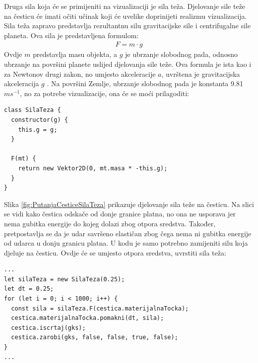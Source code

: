 \documentclass{foi}
\begin{document}
Druga sila koja će se primijeniti na vizualizaciji je sila teža. Djelovanje sile teže na česticu će imati očiti učinak koji će uvelike doprinijeti realizmu vizualizacija. Sila teža zapravo predstavlja rezultantnu silu gravitacijske sile i centrifugalne sile planeta. Ova sila je predstavljena formulom:
 \begin{align*}
F = m\cdot g
\end{align*}
Ovdje $m$ predstavlja masu objekta, a $g$ je ubrzanje slobodnog pada, odnosno ubrzanje na površini planete uslijed djelovanja sile teže. Ova formula je ista kao i za Newtonov drugi zakon, no umjesto akceleracije $a$, uvrštena je gravitacijska akceleracija $g$ \parencite{NASAWeightMass}. 
Na površini Zemlje, ubrzanje slobodnog pada je konstanta 9.81 $ms^{-1}$, no za potrebe vizualizacije, ona će se moći prilagoditi:
\begin{verbatim}
class SilaTeza {
  constructor(g) {
    this.g = g;
  }

  F(mt) {
    return new Vektor2D(0, mt.masa * -this.g);
  }
}
\end{verbatim}

Slika \ref{fig:PutanjaCesticeSilaTeza} prikazuje djelovanje sila teže na česticu. Na slici se vidi kako čestica odskače od donje granice platna, no ona ne usporava jer nema gubitka energije do kojeg dolazi zbog otpora sredstva. Također, pretpostavlja se da je udar savršeno elastičan zbog čega nema ni gubitka energije od udarca u donju granicu platna. U kodu je samo potrebno zamijeniti silu koja djeluje na česticu. Ovdje će se umjesto otpora sredstva, uvrstiti sila teža:

\begin{verbatim}
...
let silaTeza = new SilaTeza(0.25);
let dt = 0.25;
for (let i = 0; i < 1000; i++) {
  const sila = silaTeza.F(cestica.materijalnaTocka);
  cestica.materijalnaTocka.pomakni(dt, sila);
  cestica.iscrtaj(gks);
  cestica.zarobi(gks, false, false, true, false);
}
...
\end{verbatim}
\end{document}
